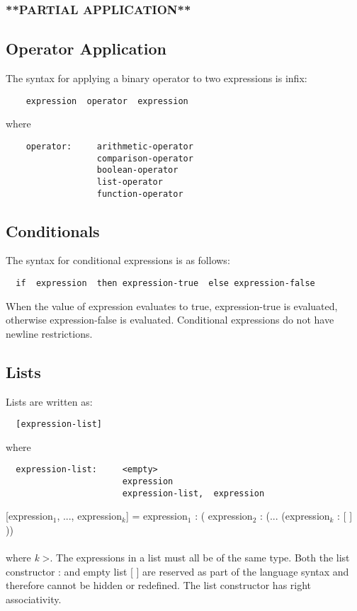   \subsubsection{**PARTIAL APPLICATION**}
  

\subsection{Operator Application}
  The syntax for applying a binary operator to two expressions is infix:
    \begin{verbatim}
    expression  operator  expression \end{verbatim} 
    where
    \begin{verbatim}
    operator:     arithmetic-operator
                  comparison-operator
                  boolean-operator
                  list-operator
                  function-operator \end{verbatim} 

\subsection{Conditionals}
  The syntax for conditional expressions is as follows:
  \begin{verbatim}
  if  expression  then expression-true  else expression-false \end{verbatim} 
  When the value of expression evaluates to true, expression-true is evaluated, otherwise expression-false is evaluated. Conditional expressions do not have newline restrictions.

\subsection{Lists}
Lists are written as:
  \begin{verbatim}
  [expression-list]\end{verbatim}
  where
  \begin{verbatim}
  expression-list:     <empty>
                       expression
                       expression-list,  expression \end{verbatim}
[expression$_{1}$, ..., expression$_{k}$]  =  expression$_{1}$ : ( expression$_{2}$ : (... (expression$_{k}$ : [ ] )) \\ \\
where \textit{k} \textgreater{}. The expressions in a list must all be of the same type. Both the list constructor : and empty list [ ] are reserved as part of the language syntax and therefore cannot be hidden or redefined. The list constructor has right associativity.

